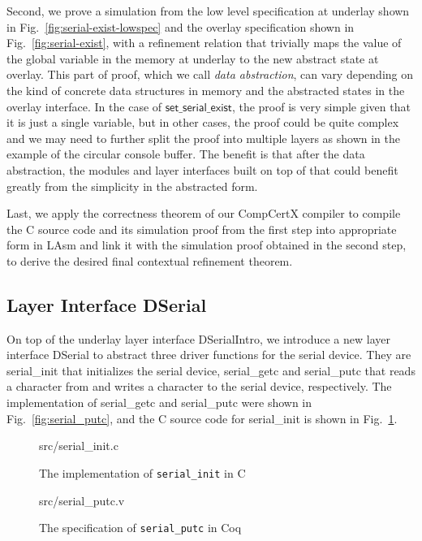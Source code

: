 Second, we prove a simulation from the low level specification at underlay shown
in Fig.~\ref{fig:serial-exist-lowspec} and the overlay specification shown in
Fig.~\ref{fig:serial-exist}, with a refinement relation that trivially maps the
value of the global variable in the memory at underlay to the new abstract state
at overlay. This part of proof, which we call {\em data abstraction}, can
vary depending on the kind of concrete data structures in memory and the
abstracted states in the overlay interface. In the case of
$\textsf{set\_serial\_exist}$, the proof is very simple given that it is just a
single variable, but in other cases, the proof could be quite complex and we
may need to further split the proof into multiple layers as shown in the example
of the circular console buffer. The benefit is that after the data abstraction,
the modules and layer interfaces built on top of that could benefit greatly from
the simplicity in the abstracted form.

Last, we apply the correctness theorem of our CompCertX compiler to compile the
C source code and its simulation proof from the first step into appropriate form
in LAsm and link it with the simulation proof obtained in the second step, to
derive the desired final contextual refinement theorem. 

\subsection{Layer Interface DSerial}

On top of the underlay layer interface DSerialIntro, we introduce a new layer
interface DSerial to abstract three driver functions for the serial device. They
are \textsf{serial\_init} that initializes the serial device,
\textsf{serial\_getc} and \textsf{serial\_putc} that reads a character from and
writes a character to the serial device, respectively. The implementation of
\textsf{serial\_getc} and \textsf{serial\_putc} were shown in
Fig.~\ref{fig:serial_putc}, and the C source code for \textsf{serial\_init} is
shown in Fig.~\ref{fig:serial_init_c}.

\begin{figure}
	 {src/serial_init.c}
	\caption{The implementation of \texttt{serial\_init} in C}
	\label{fig:serial_init_c}
\end{figure}

\begin{figure}
	 {src/serial_putc.v}
	\caption{The specification of \texttt{serial\_putc} in Coq}
	\label{fig:serial_putc_v}
\end{figure}

